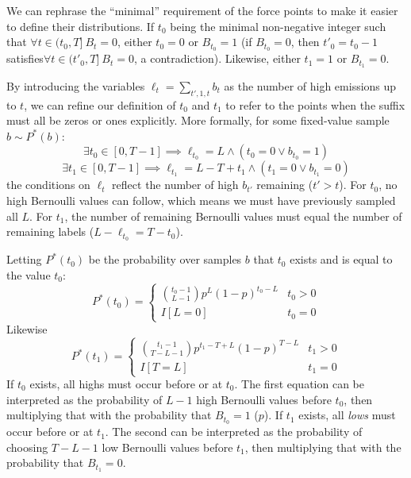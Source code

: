 \documentclass{article}
\begin{document}
We can rephrase the ``minimal'' requirement of the force points to make it
easier to define their distributions. If $t_0$ being the minimal non-negative
integer such that $\forall t \in (t_0, T] \> B_t = 0$, either $t_0 = 0$ or
$B_{t_0} = 1$ (if $B_{t_0} = 0$, then $t'_0 = t_0 - 1$ satisfies$\forall t \in (t'_0, T] \> B_t = 0$, a contradiction). Likewise, either $t_1 = 1$ or $B_{t_1}
= 0$.

By introducing the variables $\ell_t = \sum_{t',1,t} b_t$ as the number of high
emissions up to $t$, we can refine our definition of $t_0$ and $t_1$ to refer
to the points when the suffix must all be zeros or ones explicitly. More
formally, for some fixed-value sample $b \sim P^*(b)$:
%
\begin{equation} \label{eq:iid_t0}
    \exists t_0 \in [0, T - 1] \implies \ell_{t_0} = L \land
    \left(t_0 = 0 \lor b_{t_0} = 1\right)
\end{equation}
%
\begin{equation} \label{eq:iid_t1}
    \exists t_1 \in [0, T - 1] \implies \ell_{t_1} = L - T + t_1 \land
    \left(t_1 = 0 \lor b_{t_1} = 0\right)
\end{equation}
%
the conditions on $\ell_t$ reflect the number of high $b_{t'}$ remaining ($t' >
t$). For $t_0$, no high Bernoulli values can follow, which means we must have
previously sampled all $L$. For $t_1$, the number of remaining Bernoulli values
must equal the number of remaining labels ($L - \ell_{t_0} = T - t_0$).

Letting $P^*(t_0)$ be the probability over samples $b$ that $t_0$ exists and is
equal to the value $t_0$:
%
\begin{equation} \label{eq:iid_pt0}
P^*(t_0) = \begin{cases}
    \binom{t_0 - 1}{L - 1} p^L (1 - p)^{t_0 - L} & t_0 > 0 \\
    I[L = 0]                                     & t_0 = 0
\end{cases}
\end{equation}
%
Likewise
%
\begin{equation} \label{eq:iid_pt1}
P^*(t_1) = \begin{cases}
    \binom{t_1 - 1}{T - L - 1}
    p^{t_1 - T + L} (1 - p)^{T - L} & t_1 > 0 \\
    I[T = L]                        & t_1 = 0
\end{cases}
\end{equation}
%
If $t_0$ exists, all highs must occur before or at $t_0$. The first equation
can be interpreted as the probability of $L - 1$ high Bernoulli values before
$t_0$, then multiplying that with the probability that $B_{t_0} = 1$ ($p$). If
$t_1$ exists, all \emph{lows} must occur before or at $t_1$. The second can be
interpreted as the probability of choosing $T - L - 1$ low Bernoulli values
before $t_1$, then multiplying that with the probability that $B_{t_1} = 0$.
\end{document}
